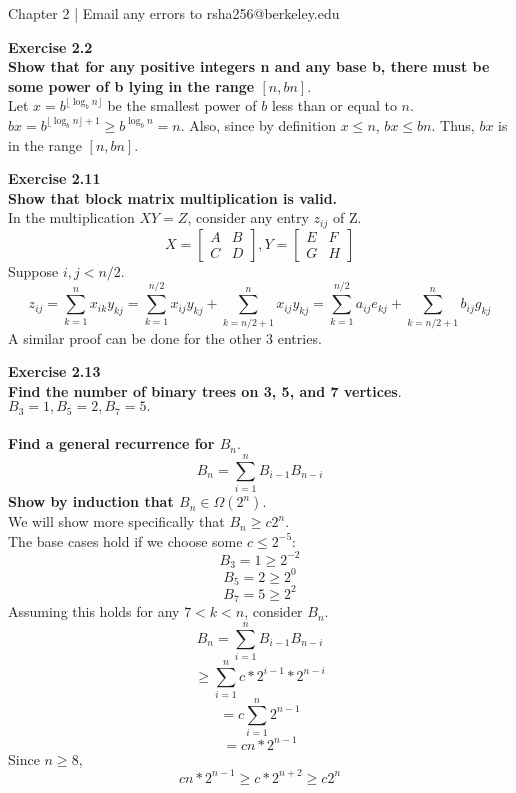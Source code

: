 \documentclass{article}
\newenvironment{problem}[2][Exercise]
    { \begin{mdframed}[backgroundcolor=gray!20] \textbf{#1 #2} \\}
    {  \end{mdframed}}
\begin{document}
\begin{mdframed}[backgroundcolor=blue!20]
Chapter 2 | Email any errors to rsha256@berkeley.edu
\end{mdframed}

\begin{problem}{2.2}
\textbf{Show that for any positive integers n and any base b, there must be some power of b lying in the range $[n, bn]$}.
\\
Let $x = b^{\lfloor \log_b n \rfloor}$ be the smallest power of $b$ less than or equal to $n$. $bx = b^{\lfloor \log_b n \rfloor + 1} \geq b^{\log_b n} = n$. Also, since by definition $x \leq n$, $bx \leq bn$. Thus, $bx$ is in the range $[n, bn]$.
\end{problem}

\begin{problem}{2.11}
    \textbf{Show that block matrix multiplication is valid.}
    \\
    In the multiplication $XY = Z$, consider any entry $z_{ij}$ of Z.
    \[
        X = 
        \begin{bmatrix}
        A & B \\ C & D
        \end{bmatrix}, 
        Y = 
        \begin{bmatrix}
        E & F \\ G & H
        \end{bmatrix}
    \]
    Suppose $i, j < n / 2$.
    \[
        z_{ij} = \sum_{k = 1}^{n} x_{ik}y_{kj} = \sum_{k = 1}^{n / 2} x_{ij}y_{kj} + \sum_{k = n / 2 + 1}^{n} x_{ij}y_{kj} = \sum_{k = 1}^{n / 2} a_{ij}e_{kj} + \sum_{k = n / 2 + 1}^{n} b_{ij}g_{kj}
    \]
    A similar proof can be done for the other 3 entries.
\end{problem}

\begin{problem}{2.13}
    \textbf{Find the number of binary trees on 3, 5, and 7 vertices}. \\
    $B_3 = 1, B_5 = 2, B_7 = 5.$ \\ \\
    \textbf{Find a general recurrence for $B_n$}.
    \[
        B_n = \sum_{i = 1}^{n} B_{i - 1}B_{n - i}
    \]
    \textbf{Show by induction that $B_n \in \Omega(2^n).$} \\
    We will show more specifically that $B_n \geq c 2^{n}$. \\
    The base cases hold if we choose some $c \leq 2^{-5}$:
    \[
        B_3 = 1 \geq 2^{-2}
    \]
    \[
        B_5 = 2 \geq 2^0
    \]
    \[
        B_7 = 5 \geq 2^2
    \]
    Assuming this holds for any $7 < k < n$, consider $B_n.$
    \[
        B_n = \sum_{i = 1}^{n} B_{i - 1}B_{n - i}
    \]
    \[
        \geq \sum_{i = 1}^{n} c * 2^{i - 1} * 2^{n - i}
    \]
    \[
        = c \sum_{i = 1}^{n} 2^{n - 1}
    \]
    \[
        = cn * 2^{n - 1}
    \]
    Since $n \geq 8$,
    \[
        cn * 2^{n - 1} \geq c * 2^{n + 2} \geq c2^n
    \]
\end{problem}
\end{document}
